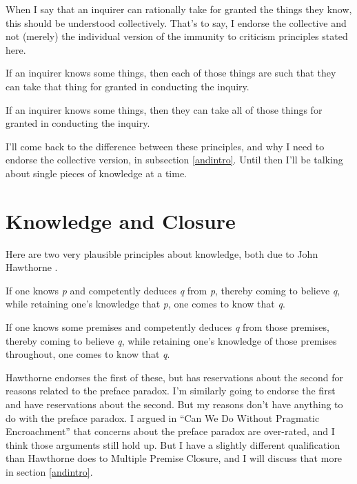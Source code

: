 \documentclass[
  11pt,
]{book}
\providecommand{\tightlist}{%
  \setlength{\itemsep}{0pt}\setlength{\parskip}{0pt}}
\begin{document}
When I say that an inquirer can rationally take for granted the things they know, this should be understood collectively. That's to say, I endorse the collective and not (merely) the individual version of the immunity to criticism principles stated here.

\begin{description}
\tightlist
\item[Take for Granted (Individual)]
If an inquirer knows some things, then each of those things are such that they can take that thing for granted in conducting the inquiry.
\item[Take for Granted (Collective)]
If an inquirer knows some things, then they can take all of those things for granted in conducting the inquiry.
\end{description}

I'll come back to the difference between these principles, and why I need to endorse the collective version, in subsection \ref{andintro}. Until then I'll be talking about single pieces of knowledge at a time.

\hypertarget{knowledge-and-closure}{%
\section{Knowledge and Closure}\label{knowledge-and-closure}}

Here are two very plausible principles about knowledge, both due to John Hawthorne \citeyearpar{Hawthorne2005}.

\begin{description}
\tightlist
\item[Single Premise Closure]
If one knows \emph{p} and competently deduces \emph{q} from \emph{p}, thereby coming to believe \emph{q}, while retaining one's knowledge that \emph{p}, one comes to know that \emph{q}. \citep[43]{Hawthorne2005}
\item[Multiple Premise Closure]
If one knows some premises and competently deduces \emph{q} from those premises, thereby coming to believe \emph{q}, while retaining one's knowledge of those premises throughout, one comes to know that \emph{q}. \citep[43]{Hawthorne2005}
\end{description}

Hawthorne endorses the first of these, but has reservations about the second for reasons related to the preface paradox. I'm similarly going to endorse the first and have reservations about the second. But my reasons don't have anything to do with the preface paradox. I argued in ``Can We Do Without Pragmatic Encroachment'' \citep{Weatherson2005-WEACWD} that concerns about the preface paradox are over-rated, and I think those arguments still hold up. But I have a slightly different qualification than Hawthorne does to Multiple Premise Closure, and I will discuss that more in section \ref{andintro}.
\end{document}
